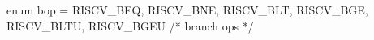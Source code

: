 enum bop = {RISCV_BEQ, RISCV_BNE, RISCV_BLT,
            RISCV_BGE, RISCV_BLTU, RISCV_BGEU}    /* branch ops */
